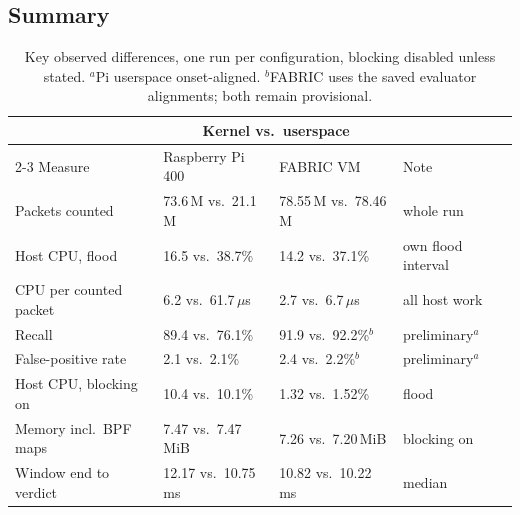 \subsection{Summary}
\label{sec:res-summary}

\begin{table}[H]
  \centering
  \small
  \setlength{\tabcolsep}{4pt}
  \begin{tabular}{llll}
    \toprule
    & \multicolumn{2}{c}{Kernel vs.\ userspace} & \\
    \cmidrule(lr){2-3}
    Measure & Raspberry Pi 400 & FABRIC VM & Note \\
    \midrule
    Packets counted         & 73.6\,M vs.\ 21.1\,M  & 78.55\,M vs.\ 78.46\,M & whole run \\
    Host CPU, flood         & 16.5 vs.\ 38.7\%      & 14.2 vs.\ 37.1\% & own flood interval \\
    CPU per counted packet  & 6.2 vs.\ 61.7\,$\mu$s & 2.7 vs.\ 6.7\,$\mu$s & all host work \\
    Recall                  & 89.4 vs.\ 76.1\%      & 91.9 vs.\ 92.2\%$^{b}$ & preliminary$^{a}$ \\
    False-positive rate     & 2.1 vs.\ 2.1\%        & 2.4 vs.\ 2.2\%$^{b}$ & preliminary$^{a}$ \\
    Host CPU, blocking on   & 10.4 vs.\ 10.1\%      & 1.32 vs.\ 1.52\% & flood \\
    Memory incl.\ BPF maps  & 7.47 vs.\ 7.47\,MiB   & 7.26 vs.\ 7.20\,MiB & blocking on \\
    Window end to verdict   & 12.17 vs.\ 10.75\,ms  & 10.82 vs.\ 10.22\,ms & median \\
    \bottomrule
  \end{tabular}
  \caption{Key observed differences, one run per configuration, blocking
  disabled unless stated. $^{a}$Pi userspace onset-aligned. $^{b}$FABRIC uses the saved evaluator alignments; both remain provisional.}
  \label{tab:summary}
\end{table}

